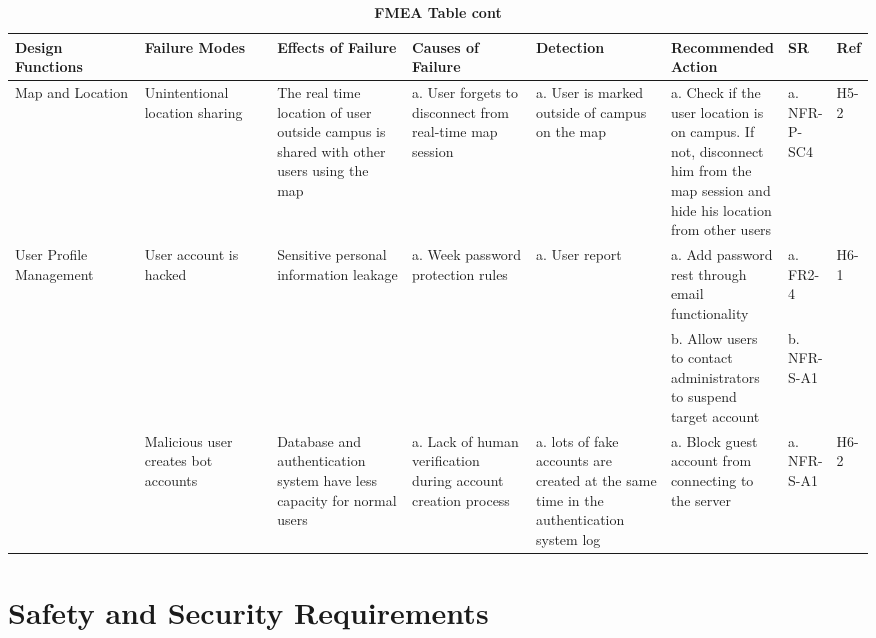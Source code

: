 \documentclass{article}
\begin{document}
\begin{table}[H]
    \begin{adjustbox}{width=(/5)}
    \centering
    

    \begin{tabular}{|p{0.20\linewidth} | p{0.20\linewidth} | p{0.20\linewidth}|  p{0.20\linewidth}|  p{0.21\linewidth}|  p{0.30\linewidth}|  p{0.08\linewidth}|p{0.07\linewidth}| }
    \hline
         \textbf{Design Functions} & \textbf{Failure Modes} & \textbf{Effects of Failure} & \textbf{Causes of Failure} &\textbf{Detection}& \textbf{Recommended Action} & \textbf{SR} & \textbf{Ref}\\
         \hline
         Map and Location     &     Unintentional location sharing      &      The real time location of user outside campus is shared with other users using the map      &      a. User forgets to disconnect from real-time map session      &      a. User is marked outside of campus on the map     &      a. Check if the user location is on campus. If not, disconnect him from the map session and hide his location from other users      &      a. NFR-P-SC4      &      H5-2      \\
         \hline
         User Profile Management     &    User account is hacked      &      Sensitive personal information leakage      &      a. Week password protection rules      &      a. User report      &      a. Add password rest through email functionality      &      a. FR2-4      &      H6-1      \\
         &&&&&      b. Allow users to contact administrators to suspend target account      &      b. NFR-S-A1      & \\
         &      Malicious user creates bot accounts      &       Database and authentication system have less capacity for normal users    &      a. Lack of human verification during account creation process      &      a. lots of fake accounts are created at the same time in the authentication system log      &      a. Block guest account from connecting to the server    &      a. NFR-S-A1      &      H6-2     \\
          \hline
    \end{tabular}
    \end{adjustbox}
    \caption{\bf FMEA Table cont}
    \label{tab:FMEA2}
\end{table}

\section{Safety and Security Requirements}
\end{document}
